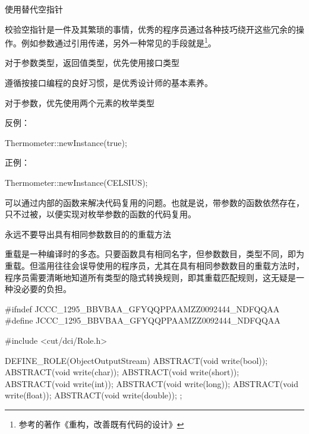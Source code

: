 \begin{content}
\begin{regulation}
使用替代空指针
\end{regulation}

校验空指针是一件及其繁琐的事情，优秀的程序员通过各种技巧绕开这些冗余的操作。例如参数通过引用传递，另外一种常见的手段就是\footnote{参考的著作《重构，改善既有代码的设计》}。

\begin{regulation}
对于参数类型，返回值类型，优先使用接口类型
\end{regulation}

遵循按接口编程的良好习惯，是优秀设计师的基本素养。

\begin{regulation}
对于参数，优先使用两个元素的枚举类型
\end{regulation}

反例：
\begin{leftbar}
\begin{c++}
Thermometer::newInstance(true);
\end{c++}
\end{leftbar}

正例：
\begin{leftbar}
\begin{c++}
Thermometer::newInstance(CELSIUS);
\end{c++}
\end{leftbar}

可以通过内部的函数来解决代码复用的问题。也就是说，带参数的函数依然存在，只不过被，以便实现对枚举参数的函数的代码复用。

\begin{regulation}
永远不要导出具有相同参数数目的的重载方法
\end{regulation}

重载是一种编译时的多态。只要函数具有相同名字，但参数数目，类型不同，即为重载。但滥用往往会误导使用的程序员，尤其在具有相同参数数目的重载方法时，程序员需要清晰地知道所有类型的隐式转换规则，即其重载匹配规则，这无疑是一种没必要的负担。

\begin{leftbar}
\begin{c++}[caption={io/ObjectOutputStream.h}]
#ifndef JCCC_1295_BBVBAA_GFYQQPPAAMZZ0092444_NDFQQAA
#define JCCC_1295_BBVBAA_GFYQQPPAAMZZ0092444_NDFQQAA

#include <cut/dci/Role.h>

DEFINE_ROLE(ObjectOutputStream)
{
    ABSTRACT(void write(bool));
    ABSTRACT(void write(char));
    ABSTRACT(void write(short));
    ABSTRACT(void write(int));
    ABSTRACT(void write(long));
    ABSTRACT(void write(float));
    ABSTRACT(void write(double));
};


\end{c++}
\end{leftbar}
\end{content}
